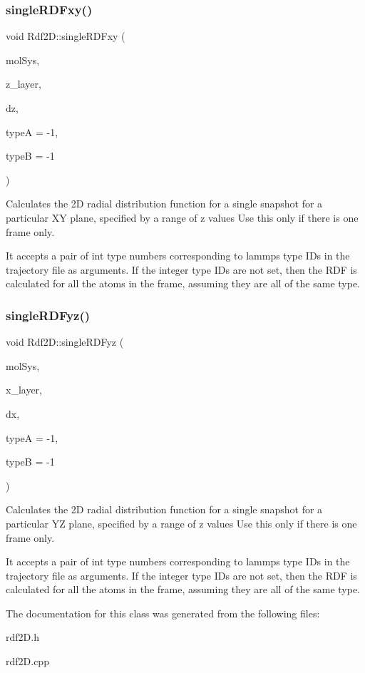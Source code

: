 \subsubsection{\texorpdfstring{single\+R\+D\+Fxy()}{singleRDFxy()}}
{\footnotesize\ttfamily void Rdf2\+D\+::single\+R\+D\+Fxy (\begin{DoxyParamCaption}\item[{class \mbox{\hyperlink{classCMolecularSystem}{C\+Molecular\+System}} \&}]{mol\+Sys,  }\item[{double}]{z\+\_\+layer,  }\item[{double}]{dz,  }\item[{int}]{typeA = {\ttfamily -\/1},  }\item[{int}]{typeB = {\ttfamily -\/1} }\end{DoxyParamCaption})}

Calculates the 2D radial distribution function for a single snapshot for a particular XY plane, specified by a range of z values Use this only if there is one frame only.

It accepts a pair of int type numbers corresponding to lammps type I\+Ds in the trajectory file as arguments. If the integer type I\+Ds are not set, then the R\+DF is calculated for all the atoms in the frame, assuming they are all of the same type. \mbox{\label{classRdf2D_a4e77d415c344954480a121f79a4aab6b}} 
\subsubsection{\texorpdfstring{single\+R\+D\+Fyz()}{singleRDFyz()}}
{\footnotesize\ttfamily void Rdf2\+D\+::single\+R\+D\+Fyz (\begin{DoxyParamCaption}\item[{class \mbox{\hyperlink{classCMolecularSystem}{C\+Molecular\+System}} \&}]{mol\+Sys,  }\item[{double}]{x\+\_\+layer,  }\item[{double}]{dx,  }\item[{int}]{typeA = {\ttfamily -\/1},  }\item[{int}]{typeB = {\ttfamily -\/1} }\end{DoxyParamCaption})}

Calculates the 2D radial distribution function for a single snapshot for a particular YZ plane, specified by a range of z values Use this only if there is one frame only.

It accepts a pair of int type numbers corresponding to lammps type I\+Ds in the trajectory file as arguments. If the integer type I\+Ds are not set, then the R\+DF is calculated for all the atoms in the frame, assuming they are all of the same type. 

The documentation for this class was generated from the following files\+:\begin{DoxyCompactItemize}
\item 
rdf2\+D.\+h\item 
rdf2\+D.\+cpp\end{DoxyCompactItemize}
